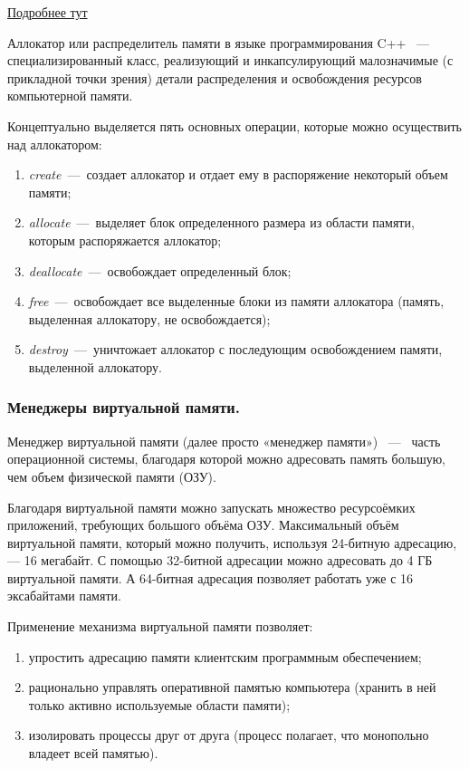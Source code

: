 \documentclass{article}
\begin{document}
\href{https://habr.com/ru/post/505632/}{Подробнее тут}

Аллокатор или распределитель памяти в языке программирования C++ ~---~ специализированный класс, реализующий и инкапсулирующий малозначимые (с прикладной точки зрения) детали распределения и освобождения ресурсов компьютерной памяти.

Концептуально выделяется пять основных операции, которые можно осуществить над аллокатором:
\begin{enumerate}
	\item \emph{create}~---~создает аллокатор и отдает ему в распоряжение некоторый объем памяти;
	\item \emph{allocate}~---~выделяет блок определенного размера из области памяти, которым распоряжается аллокатор;
	\item \emph{deallocate}~---~освобождает определенный блок;
	\item \emph{free}~---~освобождает все выделенные блоки из памяти аллокатора (память, выделенная аллокатору, не освобождается);
	\item \emph{destroy}~---~уничтожает аллокатор с последующим освобождением памяти, выделенной аллокатору.
\end{enumerate}

\subsubsection{Менеджеры виртуальной памяти.}

Менеджер виртуальной памяти (далее просто «менеджер памяти») ~---~ часть операционной системы, благодаря которой можно адресовать память большую, чем объем физической памяти (ОЗУ).

Благодаря виртуальной памяти можно запускать множество ресурсоёмких приложений, требующих большого объёма ОЗУ. Максимальный объём виртуальной памяти, который можно получить, используя 24-битную адресацию, — 16 мегабайт. С помощью 32-битной адресации можно адресовать до 4 ГБ виртуальной памяти. А 64-битная адресация позволяет работать уже с 16 эксабайтами памяти.

Применение механизма виртуальной памяти позволяет:

\begin{enumerate}
	\item упростить адресацию памяти клиентским программным обеспечением;
	\item рационально управлять оперативной памятью компьютера (хранить в ней только активно используемые области памяти);
	\item изолировать процессы друг от друга (процесс полагает, что монопольно владеет всей памятью).
\end{enumerate}
\end{document}
